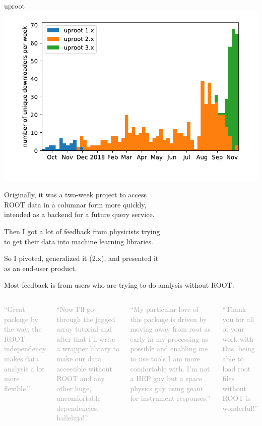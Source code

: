 \documentclass[aspectratio=169]{beamer}
\begin{document}
\begin{frame}{uproot}
\hfill \mbox{\includegraphics[height=4.5 cm]{weeks_byversion.pdf}\hspace{-1 cm}}

\vspace{-4.25 cm}
Originally, it was a two-week project to access \\ ROOT data in a columnar form more quickly, \\ intended as a backend for a future query service.

\vspace{0.35 cm}
Then I got a lot of feedback from physicists trying \\ to get their data into machine learning libraries.

\vspace{0.35 cm}
So I pivoted, generalized it (2.x), and presented it \\ as an end-user product.

\vspace{0.35 cm}
Most feedback is from users who are trying to do analysis without ROOT:

\vspace{0.05 cm}
\scriptsize
\begin{columns}
\textcolor{darkgray}{``Great package by the way, the ROOT-independency makes data analysis a lot more flexible.''}

\vspace{0.25 cm}
\textcolor{darkgray}{``Now I'll go through the jagged array tutorial and after that I'll write a wrapper library to make our data accessible without ROOT and any other huge, uncomfortable dependencies, halleluja!''}


\textcolor{darkgray}{``My particular love of this package is driven by moving away from root as early in my processing as possible and enabling me to use tools I am more comfortable with. I'm not a HEP guy but a space physics guy using geant for instrument responses.''}

\vspace{0.25 cm}
\textcolor{darkgray}{``Thank you for all of your work with this, being able to load root files without ROOT is wonderful!''}
\end{columns}
\end{frame}
\end{document}
